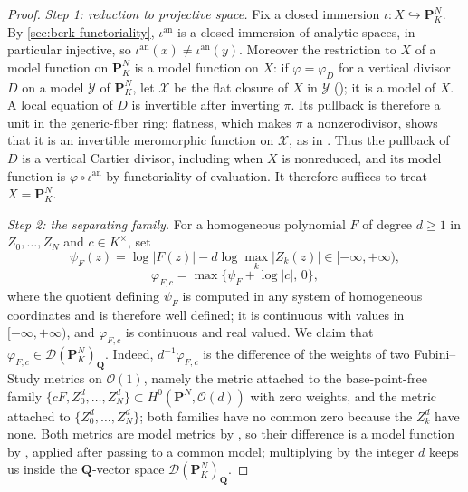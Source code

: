 \begin{proof}
\emph{Step 1: reduction to projective space.} Fix a closed immersion
$\iota:X\hookrightarrow\mathbf P^N_K$. By
\cref{sec:berk-functoriality}, $\iota^{\mathrm{an}}$ is a closed immersion
of analytic spaces, in particular injective, so
$\iota^{\mathrm{an}}(x)\ne\iota^{\mathrm{an}}(y)$. Moreover the
restriction to $X$ of a model function on $\mathbf P^N_K$ is a model
function on $X$: if $\varphi=\varphi_D$ for a vertical divisor $D$ on
a model $\mathcal Y$ of $\mathbf P^N_K$, let $\mathcal X$ be the flat
closure of $X$ in $\mathcal Y$ ();
it is a model of $X$. A local equation of $D$ is invertible after
inverting $\pi$. Its pullback is therefore a unit in the generic-fiber
ring; flatness, which makes $\pi$ a nonzerodivisor, shows that it is
an invertible meromorphic function on $\mathcal X$, as in
. Thus the pullback of $D$ is a
vertical Cartier divisor, including when $X$ is nonreduced, and
its model function is $\varphi\circ\iota^{\mathrm{an}}$ by functoriality of
evaluation. It therefore suffices to treat $X=\mathbf P^N_K$.

\emph{Step 2: the separating family.} For a homogeneous polynomial $F$ of
degree $d\ge1$ in $Z_0,\ldots,Z_N$ and $c\in K^\times$, set
\[
 \psi_{F}(z)=\log|F(z)|-d\log\max_k|Z_k(z)|\in[-\infty,+\infty),
\]
\[
 \varphi_{F,c}=\max\bigl\{\psi_F+\log|c|,\,0\bigr\},
\]
where the quotient defining $\psi_F$ is computed in any system of
homogeneous coordinates and is therefore well defined; it is continuous with
values in $[-\infty,+\infty)$, and $\varphi_{F,c}$ is continuous and
real valued. We claim that
$\varphi_{F,c}\in\mathcal D(\mathbf P^N_K)_{\mathbf Q}$. Indeed,
$d^{-1}\varphi_{F,c}$ is the difference of the weights of two
Fubini--Study metrics on $\mathcal O(1)$, namely the metric attached to
the base-point-free family $\{cF,Z_0^d,\ldots,Z_N^d\}\subset
H^0(\mathbf P^N,\mathcal O(d))$ with zero weights, and the metric attached
to $\{Z_0^d,\ldots,Z_N^d\}$; both families have no common zero because
the $Z_k^d$ have none. Both metrics are model metrics by
, so their difference is a model function by
, applied after passing to a common
model; multiplying by the integer $d$ keeps us inside the
$\mathbf Q$-vector space $\mathcal D(\mathbf P^N_K)_{\mathbf Q}$.


\end{proof}

